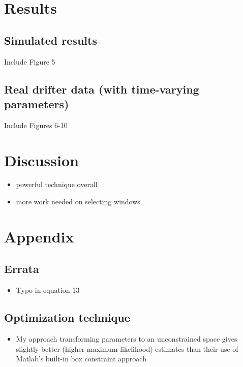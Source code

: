 \documentclass{stat572Style}
\begin{document}
\section{Results}

	\subsection{Simulated results}
		Include Figure 5
		
	\subsection{Real drifter data (with time-varying parameters)}
		Include Figures 6-10

\section{Discussion}
	\begin{itemize}
		\item powerful technique overall
		\item more work needed on selecting windows
	\end{itemize}

\section{Appendix}

\subsection{Errata}
	\begin{itemize}
		\item Typo in equation 13
	\end{itemize}

\subsection{Optimization technique}
	\begin{itemize}
		\item My approach transforming parameters to an unconstrained space gives slightly better (higher maximum likelihood) estimates than their use of Matlab's built-in box constraint approach
			\end{itemize}



\end{document}

